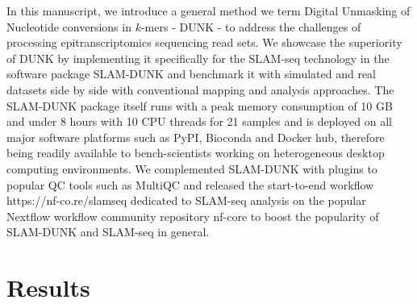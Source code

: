 In this manuscript, we introduce a general method we term Digital Unmasking of Nucleotide conversions in $k$-mers - DUNK - to address the challenges of processing epitranscriptomics sequencing read sets. We showcase the superiority of DUNK by implementing it specifically for the SLAM-seq technology in the software package SLAM-DUNK and benchmark it with simulated and real datasets side by side with conventional mapping and analysis approaches. The SLAM-DUNK package itself runs with a peak memory consumption of 10 GB and under 8 hours with 10 CPU threads for 21 samples and is deployed on all major software platforms such as PyPI, Bioconda and Docker hub, therefore being readily available to bench-scientists working on heterogeneous desktop computing environments. We complemented SLAM-DUNK with plugins to popular QC tools such as MultiQC and released the  start-to-end workflow https://nf-co.re/slamseq dedicated to SLAM-seq analysis on the popular Nextflow workflow community repository nf-core to boost the popularity of SLAM-DUNK and SLAM-seq in general.

\section{Results}



